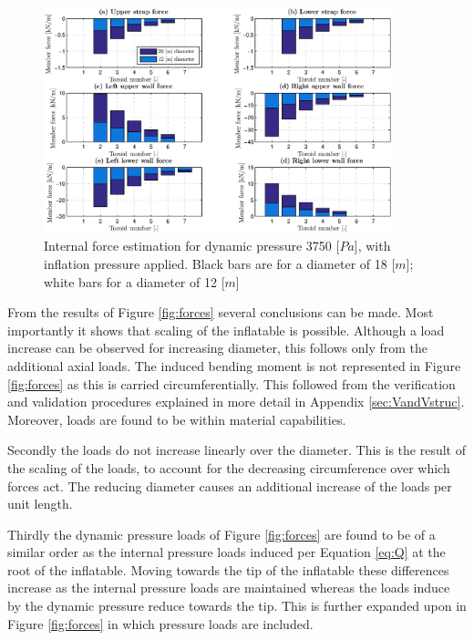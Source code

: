 \begin{figure}[h]
	\centering
	\includegraphics[width=0.9\textwidth]{./Figure/Structure/forces_test.eps}
	\caption[{Internal force estimation for dynamic pressure 3750 [$Pa$], with inflation pressure applied}]{Internal force estimation for dynamic pressure 3750 [$Pa$], with inflation pressure applied. Black bars are for a diameter of 18 [$m$]; white bars for a diameter of 12 [$m$]}
	\label{fig:forcesp}
\end{figure}


From the results of Figure \ref{fig:forces} several conclusions can be made. Most importantly it shows that scaling of the inflatable is possible. Although a load increase can be observed for increasing diameter, this follows only from the additional axial loads. The induced bending moment is not represented in Figure \ref{fig:forces} as this is carried circumferentially. This followed from the verification and validation procedures explained in more detail in Appendix \ref{sec:VandVstruc}. Moreover, loads are found to be within material capabilities.

Secondly the loads do not increase linearly over the diameter. This is the result of the scaling of the loads, to account for the decreasing circumference over which forces act. The reducing diameter causes an additional increase of the loads per unit length.

Thirdly the dynamic pressure loads of Figure \ref{fig:forces} are found to be of a similar order as the internal pressure loads induced per Equation \ref{eq:Q} at the root of the inflatable. Moving towards the tip of the inflatable these differences increase as the internal pressure loads are maintained whereas the loads induce by the dynamic pressure reduce towards the tip. This is further expanded upon in Figure \ref{fig:forces} in which pressure loads are included.

